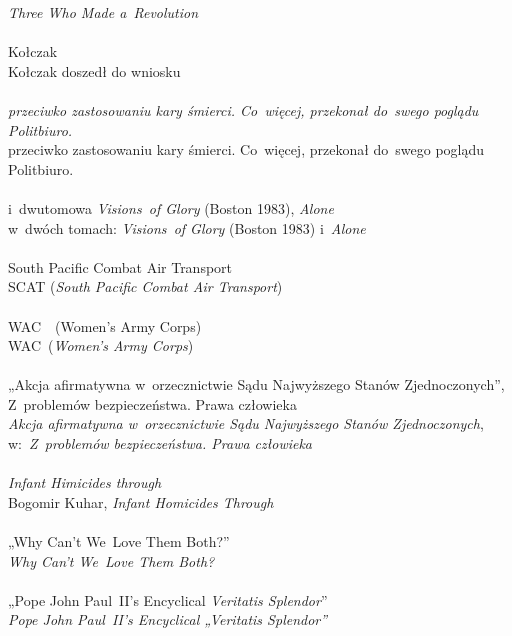 \documentclass[a4paper,11pt]{article}
\begin{document}
\Powin \emph{Three Who Made a~Revolution} \\
 \\
\Jest Kołczak \\
\Powin Kołczak doszedł do wniosku \\
 \\
\Jest \emph{przeciwko zastosowaniu kary śmierci. Co~więcej,
  przekonał do~swego poglądu Politbiuro.} \\
\Powin przeciwko zastosowaniu kary śmierci. Co~więcej, przekonał
do~swego poglądu Politbiuro. \\
 \\
\Jest i~dwutomowa \emph{Visions~of Glory} (Boston 1983), \emph{Alone} \\
\Powin w~dwóch tomach: \emph{Visions~of Glory} (Boston 1983)
i~\emph{Alone} \\
 \\
\Jest  South Pacific Combat Air Transport \\
\Powin SCAT (\emph{South Pacific Combat Air Transport}) \\
 \\
\Jest  WAC~~(Women's Army Corps) \\
\Powin WAC~(\emph{Women's Army Corps}) \\
 \\
\Jest „Akcja afirmatywna w~orzecznictwie Sądu Najwyższego Stanów
Zjednoczonych”, Z~problemów bezpieczeństwa. Prawa człowieka \\
\Powin \emph{Akcja afirmatywna w~orzecznictwie Sądu Najwyższego Stanów
  Zjednoczonych}, w:~\emph{Z~problemów bezpieczeństwa. Prawa człowieka} \\
 \\
\Jest \emph{Infant Himicides through} \\
\Powin Bogomir Kuhar, \emph{Infant Homicides Through} \\
 \\
\Jest „Why Can't We~Love Them Both?” \\
\Powin \emph{Why Can't We~Love Them Both?} \\
 \\
\Jest „Pope John Paul~II's Encyclical \emph{Veritatis Splendor}” \\
\Powin \emph{Pope John Paul~II's Encyclical „Veritatis Splendor”} \\


\vspace{\spaceTwo}
\end{document}
